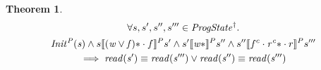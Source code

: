\documentclass[letterpaper,twocolumn,10pt]{article}
\newtheorem{theorem}{Theorem}[section]
\theoremstyle{definition}
\renewcommand{\i}[1]{\ensuremath{\mathit{#1}}}
\begin{document}
\begin{theorem}
\begin{multline*}
      \forall s, s', s'', s''' \in \i{ProgState^\dagger} \ldotp\\\i{Init^P(s)} \land s \llbracket \i{(w \lor f)\ast} \cdot f \rrbracket^P s' \land
      s' \llbracket \i{w\ast} \rrbracket^P s'' \land
      s'' \llbracket f^c \cdot \i{r^c\ast} \cdot r \rrbracket^P s'''\\
      \implies \i{read(s')} \equiv \i{read(s''')} \lor \i{read(s'')} \equiv \i{read(s''')}
\end{multline*}
\end{theorem}
\end{document}
